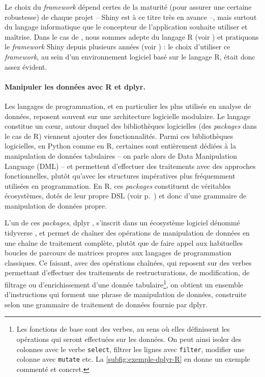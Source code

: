 Le choix du \textit{framework} dépend certes de la maturité (pour assurer une certaine robustesse) de chaque projet -- \textsf{Shiny} est à ce titre très en avance --, mais surtout du langage informatique que le concepteur de l'application souhaite utiliser et maîtrise.
Dans le cas de \simedb{}, nous sommes adepte du langage \textsf{R} (voir \cite{commenges_r_2014}) et pratiquons le \textit{framework} \textsf{Shiny} depuis plusieurs années (voir \cite{cura_creer_2015}) : le choix d'utiliser ce \textit{framework}, au sein d'un environnement logiciel basé sur le langage \textsf{R}, était donc assez évident.


\paragraph{Manipuler les données avec \textsf{R} et \textsf{dplyr}.}

Les langages de programmation, et en particulier les plus utilisés en analyse de données, reposent souvent sur une architecture logicielle modulaire.
Le langage constitue un cœur, autour duquel des bibliothèques logicielles (des \textit{packages} dans le cas de \textsf{R}) viennent ajouter des fonctionnalités.
Parmi ces bibliothèques logicielles, en Python comme en R, certaines sont entièrement dédiées à la manipulation de données tabulaires -- on parle alors de \og Data Manipulation Language\fg{} (DML) -- et permettent d'effectuer des traitements avec des approches fonctionnelles, plutôt qu'avec les structures impératives plus fréquemment utilisées en programmation.
En \textsf{R}, ces \textit{packages} constituent de véritables écosystèmes, dotés de leur propre DSL (voir p.~\pageref{par:DSL}) et donc d'une grammaire de manipulation de données propre.

L'un de ces \textit{packages}, \textsf{dplyr} \autocite{wickham_dplyr_2015}, s'inscrit dans un écosystème logiciel dénommé \textsf{tidyverse} \autocite{wickham_tidyverse_2017}, et permet de chaîner des opérations de manipulation de données en une chaîne de traitement complète, plutôt que de faire appel aux habituelles boucles de parcours de matrices propres aux langages de programmation classiques.
Ce faisant, avec des opérations chaînées, qui reposent sur des \og verbes\fg{} permettant d'effectuer des traitements de restructurations, de modification, de filtrage ou d'enrichissement d'une donnée tabulaire\footnote{
	Les fonctions de base sont des \og verbes\fg{}, au sens où elles définissent les opérations qui seront effectuées sur les données.
	On peut ainsi isoler des colonnes avec le \og verbe\fg{} \texttt{select}, filtrer les lignes avec \texttt{filter}, modifier une colonne avec \texttt{mutate} etc.
	La \cref{subfig:exemple-dplyr-R} en donne un exemple commenté et concret.
}, on obtient un ensemble d'instructions qui forment une \og phrase\fg{} de manipulation de données, construite selon une \og grammaire de traitement de données\fg{} fournie par \textsf{dplyr}.


